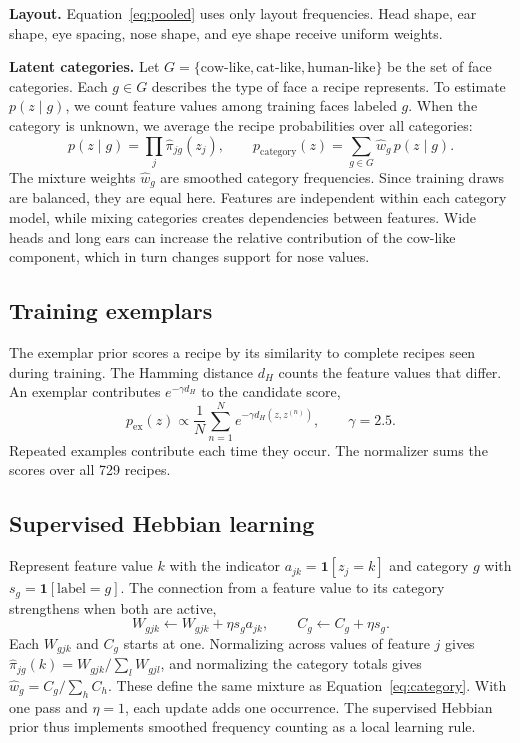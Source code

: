 \documentclass[11pt,letterpaper]{article}
\begin{document}
\textbf{Layout.} Equation~\eqref{eq:pooled} uses only layout frequencies. Head shape, ear shape, eye spacing, nose shape, and eye shape receive uniform weights.

\textbf{Latent categories.} Let $G=\{\text{cow-like},\text{cat-like},\text{human-like}\}$ be the set of face categories. Each $g\in G$ describes the type of face a recipe represents. To estimate $p(z\mid g)$, we count feature values among training faces labeled $g$. When the category is unknown, we average the recipe probabilities over all categories:
\begin{equation}
p(z\mid g)=\prod_j\widehat\pi_{jg}(z_j),\qquad
p_{\mathrm{category}}(z)=\sum_{g\in G}\widehat w_g\,p(z\mid g).
\label{eq:category}
\end{equation}
The mixture weights $\widehat w_g$ are smoothed category frequencies. Since training draws are balanced, they are equal here. Features are independent within each category model, while mixing categories creates dependencies between features. Wide heads and long ears can increase the relative contribution of the cow-like component, which in turn changes support for nose values.

\subsection{Training exemplars}
The exemplar prior scores a recipe by its similarity to complete recipes seen during training. The Hamming distance $d_H$ counts the feature values that differ. An exemplar contributes $e^{-\gamma d_H}$ to the candidate score,
\begin{equation}
p_{\mathrm{ex}}(z)\propto \frac{1}{N}\sum_{n=1}^N
  e^{-\gamma d_H(z,z^{(n)})},\qquad \gamma=2.5.
\end{equation}
Repeated examples contribute each time they occur. The normalizer sums the scores over all 729 recipes.

\subsection{Supervised Hebbian learning}
Represent feature value $k$ with the indicator $a_{jk}=\mathbf 1[z_j=k]$ and category $g$ with $s_g=\mathbf 1[\text{label}=g]$. The connection from a feature value to its category strengthens when both are active,
\begin{equation}
W_{gjk}\leftarrow W_{gjk}+\eta s_g a_{jk},
\qquad C_g\leftarrow C_g+\eta s_g.
\end{equation}
Each $W_{gjk}$ and $C_g$ starts at one. Normalizing across values of feature $j$ gives $\widehat\pi_{jg}(k)=W_{gjk}/\sum_l W_{gjl}$, and normalizing the category totals gives $\widehat w_g=C_g/\sum_h C_h$. These define the same mixture as Equation~\eqref{eq:category}. With one pass and $\eta=1$, each update adds one occurrence. The supervised Hebbian prior thus implements smoothed frequency counting as a local learning rule.
\end{document}
